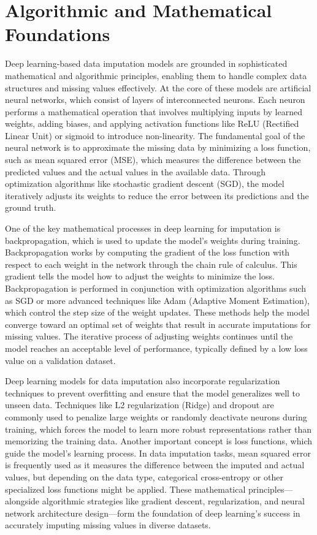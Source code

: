 \documentclass{article}
\begin{document}
\section{Algorithmic and Mathematical Foundations}
Deep learning-based data imputation models are grounded in sophisticated mathematical and algorithmic principles, enabling them to handle complex data structures and missing values effectively. At the core of these models are artificial neural networks, which consist of layers of interconnected neurons. Each neuron performs a mathematical operation that involves multiplying inputs by learned weights, adding biases, and applying activation functions like ReLU (Rectified Linear Unit) or sigmoid to introduce non-linearity. The fundamental goal of the neural network is to approximate the missing data by minimizing a loss function, such as mean squared error (MSE), which measures the difference between the predicted values and the actual values in the available data. Through optimization algorithms like stochastic gradient descent (SGD), the model iteratively adjusts its weights to reduce the error between its predictions and the ground truth.

One of the key mathematical processes in deep learning for imputation is backpropagation, which is used to update the model’s weights during training. Backpropagation works by computing the gradient of the loss function with respect to each weight in the network through the chain rule of calculus. This gradient tells the model how to adjust the weights to minimize the loss. Backpropagation is performed in conjunction with optimization algorithms such as SGD or more advanced techniques like Adam (Adaptive Moment Estimation), which control the step size of the weight updates. These methods help the model converge toward an optimal set of weights that result in accurate imputations for missing values. The iterative process of adjusting weights continues until the model reaches an acceptable level of performance, typically defined by a low loss value on a validation dataset.

Deep learning models for data imputation also incorporate regularization techniques to prevent overfitting and ensure that the model generalizes well to unseen data. Techniques like L2 regularization (Ridge) and dropout are commonly used to penalize large weights or randomly deactivate neurons during training, which forces the model to learn more robust representations rather than memorizing the training data. Another important concept is loss functions, which guide the model’s learning process. In data imputation tasks, mean squared error is frequently used as it measures the difference between the imputed and actual values, but depending on the data type, categorical cross-entropy or other specialized loss functions might be applied. These mathematical principles—alongside algorithmic strategies like gradient descent, regularization, and neural network architecture design—form the foundation of deep learning’s success in accurately imputing missing values in diverse datasets.
\pagebreak
\end{document}
